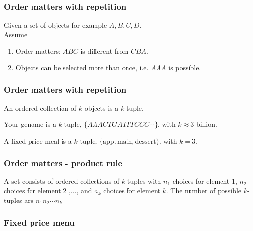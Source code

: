 \begin{frame}[fragile]\frametitle{Order matters with repetition}

Given a set of objects for example $A,B,C,D$. \\
 

Assume
\begin{enumerate}

\item Order matters: $ABC$ is different from $CBA$.

\item Objects can be selected more than once, i.e. $AAA$ is possible.

\end{enumerate}

\end{frame}


\begin{frame}[fragile]\frametitle{Order matters with repetition}


An ordered collection of $k$ objects is a $k$-tuple. \\ 

\vspace{.1in}

Your genome is a $k$-tuple, $\{AAACTGATTTCCC \cdots \}$,
with $k \approx 3$ billion. \\ 

\vspace{.1in}

A fixed price meal is a $k$-tuple, $\{\mbox{app},\mbox{main},\mbox{dessert}\}$,
with $k = 3$. 

\end{frame}




\begin{frame}[fragile]\frametitle{Order matters - product rule}

\begin{prop}
A set consists of ordered collections of $k$-tuples with $n_1$ choices
for element $1$, $n_2$ choices for element $2$ ,..., and $n_k$ choices
for element $k$. The number of possible $k$-tuples are 
$n_1 n_2 \cdots n_k$.
\end{prop}
 
\end{frame}


\begin{frame}[fragile]\frametitle{Fixed price menu}


\end{frame}


